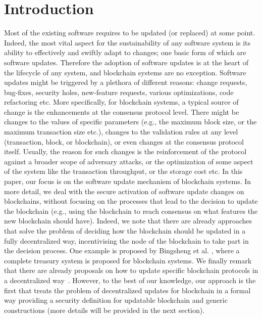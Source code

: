 \section{Introduction}

Most of the existing software requires to be updated (or replaced) at some point. Indeed, the most vital aspect for the sustainability of any software system is its ability to effectively and swiftly adapt to changes; one basic form of which are software updates. Therefore the adoption of software updates is at the heart of the lifecycle of any system, and blockchain systems are no exception. Software updates might be triggered by a plethora of different reasons: change requests, bug-fixes, security holes, new-feature requests, various optimizations, code refactoring etc.
More specifically, for blockchain systems, a typical source of change is the enhancements at the consensus protocol level. There might be changes to the values of specific parameters (e.g., the maximum block size, or the maximum transaction size etc.), changes to the validation rules at any level (transaction, block, or blockchain), or even changes at the consensus protocol itself. Usually, the reason for such changes is the reinforcement of the protocol against a broader scope of adversary attacks, or the optimization of some aspect of the system like the transaction throughput, or the storage cost etc.
In this paper, our focus is on the software update mechanism of blockchain systems. 
In more detail, we deal with the secure activation of software update changes on blockchains, without focusing on the processes that lead to the decision to update the blockchain (e.g., using the blockchain to reach consensus on
what features the new blockchain should have). 
Indeed, we note that there are already approaches that solve
the problem of deciding how the blockchain should be updated in a fully decentralized way, incentivising the node of the blockchain to take part in the decision process. 
 One example is proposed by Bingsheng et al. \cite{NDSS:ZhaOliBal19}, where a complete treasury system is proposed for blockchain systems.
 We finally remark that there are already proposals on how to update specific blockchain protocols in a 
 decentralized way~\cite{dash,decred,tezos}. However, to the best of our knowledge, our approach is the first that treats the problem of decentralized updates for blockchain in a formal way providing a security definition 
 for updatable blockchain and generic constructions (more details will be provided in the next section).




